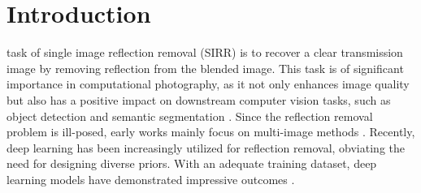 \documentclass[10pt,journal]{IEEEtran}
\begin{document}
\section{Introduction}
 task of single image reflection removal (SIRR) is to recover a clear transmission image by removing reflection from the blended image. This task is of significant importance in computational photography, as it not only enhances image quality but also has a positive impact on downstream computer vision tasks, such as object detection \cite{chenHighQualityRCNNObject2021,9934934,9968016} and semantic segmentation \cite{wengStageAwareFeatureAlignment2022,maPRSegLightweightPatch2023}. 
Since the reflection removal problem is ill-posed, early works mainly focus on multi-image methods \cite{gaiBlindSeparationSuperimposed2011,guoRobustSeparationReflection2014,hanReflectionRemovalUsing2017,szeliskiLayerExtractionMultiple2000,sarelSeparatingTransparentLayers2004,liExploitingReflectionChange2013,xueComputationalApproachObstructionfree2015,sunAutomaticReflectionRemoval2016}. 
Recently, deep learning has been increasingly utilized for reflection removal, obviating the need for designing diverse priors.  With an adequate training dataset, deep learning models have demonstrated impressive outcomes \cite{fanGenericDeepArchitecture2017,wanCrrnMultiscaleGuided2018,johnsonPerceptualLossesRealtime2016,yangSeeingDeeplyBidirectionally2018,chiSingleImageReflection2018,jinLearningSeeReflections2018,leeGenerativeSingleImage2018,zhangSingleImageReflection2018,wanCoRRNCooperativeReflection2019,wenSingleImageReflection2019,weiSingleImageReflection2019,kimSingleImageReflection2020,liSingleImageReflection2020,leiRobustReflectionRemoval2021,liImageReflectionRemoval2022,songMultistageCurvatureGuidedNetwork2022,zhangSingleImageReflection2023,songRealSceneReflectionRemoval2023,fengU2FormerNestedUshaped2023,song2023robust}.
\end{document}

